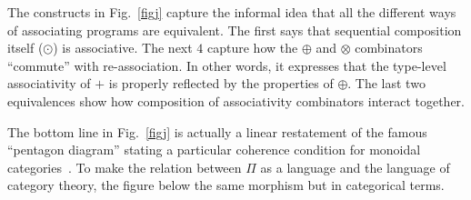 \documentclass{article}
\newcommand{\assocrt}{\ensuremath{\mathit{assocr}_*}}
\begin{document}
The constructs in Fig.~\ref{figj} capture the informal idea that all
the different ways of associating programs are equivalent. The first
says that sequential composition itself ($\odot$) is associative.
The next $4$ capture how
the $\oplus$ and $\otimes$ combinators ``commute'' with re-association.
In other words, it expresses that the type-level associativity of $+$ is
properly reflected by the properties of $\oplus$.
The last two equivalences show how composition of associativity combinators
interact together. 

The bottom line in Fig.~\ref{figj} is actually a linear
restatement of the famous ``pentagon diagram'' stating a
particular coherence condition for monoidal categories~\cite{KELLY197197}.
To make the relation between $\Pi$ as a language and the
language of category theory, the figure below
the same morphism but in categorical terms.

\begin{center}
\end{center}
\end{document}
